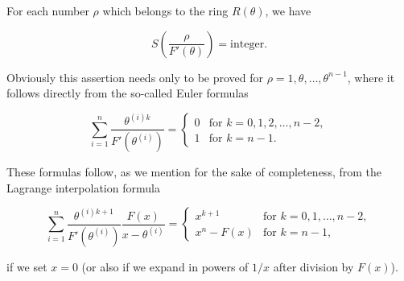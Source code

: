 For each number $\rho$ which belongs to the ring $R(\theta)$, we have

$$S\left(\frac{\rho}{F'(\theta)}\right) = \text{integer}.$$

Obviously this assertion needs only to be proved for $\rho = 1, \theta, \ldots, \theta^{n-1}$, where it follows directly from the so-called Euler formulas

$$\sum_{i=1}^{n} \frac{\theta^{(i)k}}{F'(\theta^{(i)})} = \begin{cases} 0 & \text{for } k = 0, 1, 2, \ldots, n-2, \\ 1 & \text{for } k = n-1. \end{cases}$$

These formulas follow, as we mention for the sake of completeness, from the Lagrange interpolation formula

$$\sum_{i=1}^{n} \frac{\theta^{(i)k+1}}{F'(\theta^{(i)})} \frac{F(x)}{x - \theta^{(i)}} = \begin{cases} x^{k+1} & \text{for } k = 0, 1, \ldots, n-2, \\ x^n - F(x) & \text{for } k = n-1, \end{cases}$$

if we set $x = 0$ (or also if we expand in powers of $1/x$ after division by $F(x)$).
